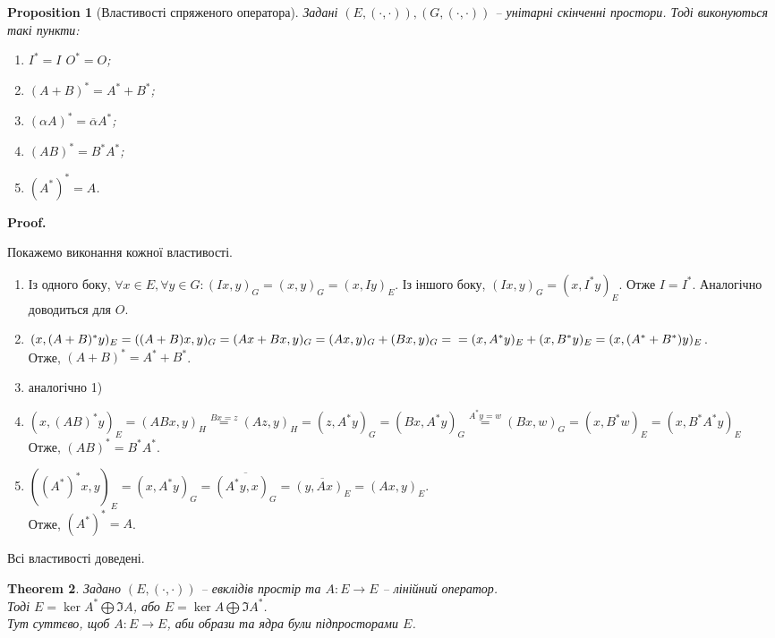 \documentclass[a4paper, 10pt]{article}
\makeatletter
\theoremstyle{theoremdd}
\newtheorem{theorem}{Theorem}[subsection]
\newtheorem{proposition}[theorem]{Proposition}
\renewenvironment{proof}[1][Proof.\\]{\par
\pushQED{\hfill \qed}%
\normalfont \topsep6\p@\@plus6\p@\relax
\trivlist
\item\relax
{\bfseries
#1\@addpunct{.}}\hspace\labelsep\ignorespaces
}{%
\popQED\endtrivlist\@endpefalse
}
\makeatother
\begin{document}
\begin{proposition}[Властивості спряженого оператора]
Задані $(E,(\cdot,\cdot)), (G,(\cdot,\cdot))$ -- унітарні скінченні простори. Тоді виконуються такі пункти:
\begin{enumerate}[nosep,wide=0pt,label={\arabic*)},start=0]
\item $I^* = I$ \qquad $O^* = O$;
\item $(A+B)^* = A^* + B^*$;
\item $(\alpha A)^* = \overline{\alpha} A^*$;
\item $(AB)^* = B^* A^*$;
\iffalse \item $(x,Ay) = (A^*x,y)$;\fi
\item $(A^*)^* = A$.
\end{enumerate}
\end{proposition}

\begin{proof}
Покажемо виконання кожної властивості.
\begin{enumerate}[topsep=-\parskip, wide=0pt, label={\arabic*)}, start=0]
\item Із одного боку, $\forall x \in E, \forall y \in G: (Ix,y)_G = (x,y)_G = (x, Iy)_E$. Із іншого боку, $(Ix,y)_G = (x,I^*y)_E$. Отже $I = I^*$. Аналогічно доводиться для $O$.
\item $(x,(A+B)^*y)_E = ((A+B)x,y)_G = (Ax+Bx,y)_G = (Ax,y)_G + (Bx, y)_G = \\ = (x,A^* y)_E+(x,B^* y)_E = (x,(A^*+B^*)y)_E$.\\
Отже, $(A+B)^* = A^* + B^*$.
\item аналогічно 1)
\item $(x,(AB)^*y)_E = (ABx, y)_H \overset{Bx = z}{=} (Az,y)_H = (z, A^*y)_G = (Bx, A^*y)_G \overset{A^* y = w}{=} (Bx,w)_G = (x, B^* w)_E = (x, B^* A^* y)_E$\\
Отже, $(AB)^* = B^* A^*$.
\iffalse \item $(x,Ay) = \overline{(Ay, x)} = \overline{(y, A^*x)} = (A^*x, y)$. \fi
\item $((A^*)^*x,y)_E = (x,A^*y)_G = \overline{(A^*y,x)_G} = \overline{(y,Ax)_E} = (Ax,y)_E$.\\
Отже, $(A^*)^* = A$.
\end{enumerate}
Всі властивості доведені.
\end{proof}

\begin{theorem}
\label{euclid_decomposition}
Задано $(E,(\cdot,\cdot))$ -- евклідів простір та $A: E \to E$ -- лінійний оператор.\\
Тоді $E = \ker A^* \bigoplus \Im A$, \hspace{2cm} або $E = \ker A \bigoplus \Im A^*$.\\
\textit{Тут суттєво, щоб $A \colon E \to E$, аби образи та ядра були підпросторами $E$.}
\end{theorem}
\end{document}
